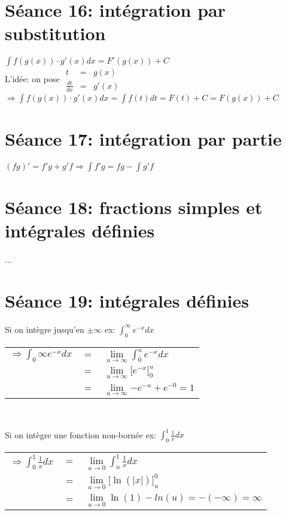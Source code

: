 \documentclass[12pt]{article}
\begin{document}
\section*{S\'eance 16: int\'egration par substitution}

$\int{f(g(x))\cdot g'(x) dx} = F'(g(x)) + C$ \\
\newline
L'id\'ee: on pose 
\(\begin{array}{ccc} 
t &=& g(x) \\ 
\frac{dt}{dx} &=& g'(x) 
\end{array} \) $\Rightarrow \int{f(g(x)) \cdot g'(x) dx} = \int{f(t) dt} = F(t) + C = F(g(x)) + C$ \\

\section*{S\'eance 17: int\'egration par partie}

$(fg)' = f'g + g'f \Rightarrow \int{f'g} = fg - \int{g'f}$ 

\section*{S\'eance 18: fractions simples et int\'egrales d\'efinies}

...

\section*{S\'eance 19: int\'egrales d\'efinies}

Si on int\`egre jusqu'en $\pm \infty$ ex: $\int_{0}^{\infty}{e^{-x} dx}$ \\

\begin{tabular}{ r c l }
  \( \Rightarrow \int_{0}{\infty}{e^{-x} dx} \)& \(=\) & \(\underset{u\to \infty}\lim \int_{0}^{u}{e^{-x} dx}\) \\
   & \(=\) & \(\underset{u\to \infty}\lim \lbrack e^{-x}\rbrack_{0}^{u}\) \\
   & \(=\) & \(\underset{u\to \infty}\lim{-e^{-u} + e^{-0}} = 1\)
\end{tabular} \\ \newline

Si on int\`egre une fonction non-born\'ee ex: $\int_{0}^{1}{\frac{1}{x} dx}$ \\
\begin{tabular}{r c l }
	\( \Rightarrow \int_{0}^{1}{\frac{1}{x} dx}\) & \( = \) & \(\underset{u\to 0}\lim{\int_{u}^{1}{\frac{1}{x} dx}}\) \\
	& \( = \) & \(\underset{u\to 0}\lim{\lbrack \ln(|x|) \rbrack_{u}^{0}}\) \\
	& \( = \) & \(\underset{u\to 0}\lim{\ln(1) - ln(u)} = -(-\infty) = \infty\)
\end{tabular}
\end{document}
